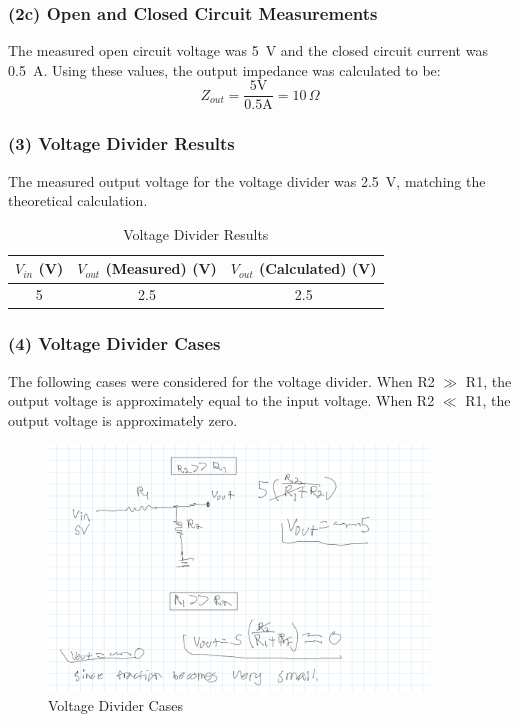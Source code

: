 \documentclass{article}
\begin{document}
    \subsubsection{(2c) Open and Closed Circuit Measurements}
    The measured open circuit voltage was \SI{5}{V} and the closed circuit current was \SI{0.5}{A}. Using these values, the output impedance was calculated to be:
    \[
    Z_{out} = \frac{5 \text{V}}{0.5 \text{A}} = 10 \, \Omega
    \]

    \subsubsection{(3) Voltage Divider Results}
    The measured output voltage for the voltage divider was \SI{2.5}{V}, matching the theoretical calculation.

    \begin{table}[H]
    \centering
    \caption{Voltage Divider Results}
    \begin{tabular}{|c|c|c|}
    \hline
    $V_{in}$ (V) & $V_{out}$ (Measured) (V) & $V_{out}$ (Calculated) (V) \\ \hline
    5            & 2.5                      & 2.5                        \\ \hline
    \end{tabular}
    \end{table}

    \subsubsection{(4) Voltage Divider Cases}
    The following cases were considered for the voltage divider. When R2 $\gg$ R1, the output voltage is 
    approximately equal to the input voltage. When R2 $\ll$ R1, the output voltage is approximately zero.

    \begin{figure}[H]
        \centering
        \includegraphics[width=0.9\textwidth]{img/Lab1_4.png}  %
        \caption{Voltage Divider Cases}
        \label{fig:voltage_divider_cases}
    \end{figure}
\end{document}
